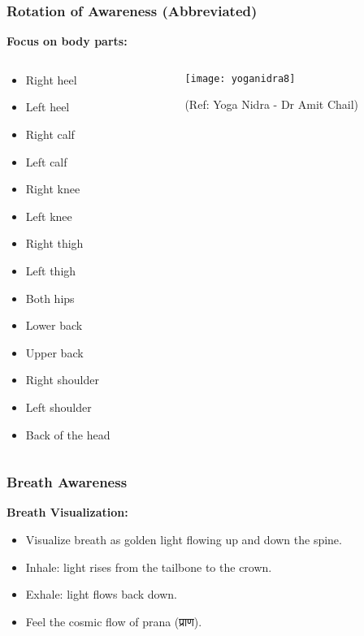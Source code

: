 \begin{frame}[fragile]\frametitle{Rotation of Awareness (Abbreviated)}
    \textbf{Focus on body parts:}

\begin{columns}
    \begin{column}[T]{0.6\linewidth}
    \begin{itemize}
        \item Right heel
        \item Left heel
        \item Right calf
        \item Left calf
        \item Right knee
        \item Left knee
        \item Right thigh
        \item Left thigh
        \item Both hips
        \item Lower back
        \item Upper back
        \item Right shoulder
        \item Left shoulder
        \item Back of the head
    \end{itemize}

    \end{column}
    \begin{column}[T]{0.4\linewidth}
	      \begin{center}
        \texttt{[image: yoganidra8]}

		{\tiny (Ref: Yoga Nidra - Dr Amit Chail)}		
        \end{center}
    \end{column}
  \end{columns}
  
  

	
	
\end{frame}

\begin{frame}[fragile]\frametitle{Breath Awareness}
    \textbf{Breath Visualization:}
    \begin{itemize}
        \item Visualize breath as golden light flowing up and down the spine.
        \item Inhale: light rises from the tailbone to the crown.
        \item Exhale: light flows back down.
        \item Feel the cosmic flow of prana (प्राण).
    \end{itemize}
\end{frame}

